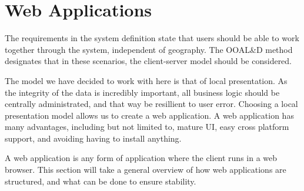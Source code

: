 \section{Web Applications}
The requirements in the system definition state that users should be able to work together through the system, independent of geography.
The OOAL\&D method designates that in these scenarios, the client-server model should be considered.

The model we have decided to work with here is that of local presentation.
As the integrity of the data is incredibly important, all business logic should be centrally administrated, and that way be resillient to user error.
Choosing a local presentation model allows us to create a web application.
A web application has many advantages, including but not limited to, mature UI, easy cross platform support, and avoiding having to install anything.

A web application is any form of application where the client runs in a web browser.
This section will take a general overview of how web applications are structured, and what can be done to ensure stability.
